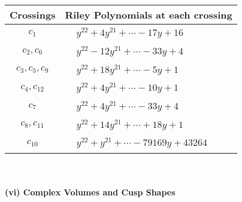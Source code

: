 \documentclass[1p]{elsarticle_modified}
\theoremstyle{definition}
\begin{document}
\begin{tabular}{m{50pt}|m{274pt}}
Crossings & \hspace{64pt}Riley Polynomials at each crossing \\
\hline $$\begin{aligned}c_{1}\end{aligned}$$&$\begin{aligned}
&y^{22}+4 y^{21}+\cdots-17 y+16
\end{aligned}$\\
\hline $$\begin{aligned}c_{2},c_{6}\end{aligned}$$&$\begin{aligned}
&y^{22}-12 y^{21}+\cdots-33 y+4
\end{aligned}$\\
\hline $$\begin{aligned}c_{3},c_{5},c_{9}\end{aligned}$$&$\begin{aligned}
&y^{22}+18 y^{21}+\cdots-5 y+1
\end{aligned}$\\
\hline $$\begin{aligned}c_{4},c_{12}\end{aligned}$$&$\begin{aligned}
&y^{22}+4 y^{21}+\cdots-10 y+1
\end{aligned}$\\
\hline $$\begin{aligned}c_{7}\end{aligned}$$&$\begin{aligned}
&y^{22}+4 y^{21}+\cdots-33 y+4
\end{aligned}$\\
\hline $$\begin{aligned}c_{8},c_{11}\end{aligned}$$&$\begin{aligned}
&y^{22}+14 y^{21}+\cdots+18 y+1
\end{aligned}$\\
\hline $$\begin{aligned}c_{10}\end{aligned}$$&$\begin{aligned}
&y^{22}+y^{21}+\cdots-79169 y+43264
\end{aligned}$\\
\hline
\end{tabular}\\~\\
\newpage\flushleft \textbf{(vi) Complex Volumes and Cusp Shapes}
\end{document}
